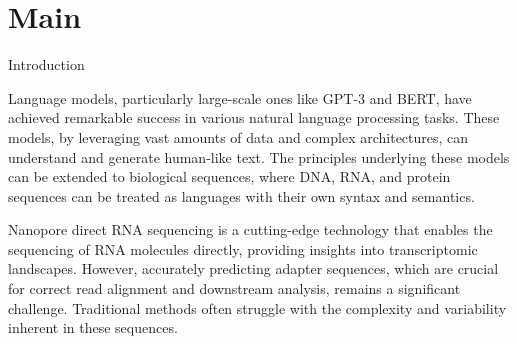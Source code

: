 \documentclass[pdflatex, sn-mathphys-num, lineno]{sn-jnl}%
\theoremstyle{thmstyleone}%
\theoremstyle{thmstyletwo}%
\theoremstyle{thmstylethree}%
\begin{document}
\maketitle

\section{Main}\label{sec1}


Introduction

Language models, particularly large-scale ones like GPT-3 and BERT, have achieved remarkable success in various natural language processing tasks.
These models, by leveraging vast amounts of data and complex architectures, can understand and generate human-like text.
The principles underlying these models can be extended to biological sequences, where DNA, RNA, and protein sequences can be treated as languages with their own syntax and semantics.

Nanopore direct RNA sequencing is a cutting-edge technology that enables the sequencing of RNA molecules directly, providing insights into transcriptomic landscapes.
However, accurately predicting adapter sequences, which are crucial for correct read alignment and downstream analysis, remains a significant challenge.
Traditional methods often struggle with the complexity and variability inherent in these sequences.
\end{document}
